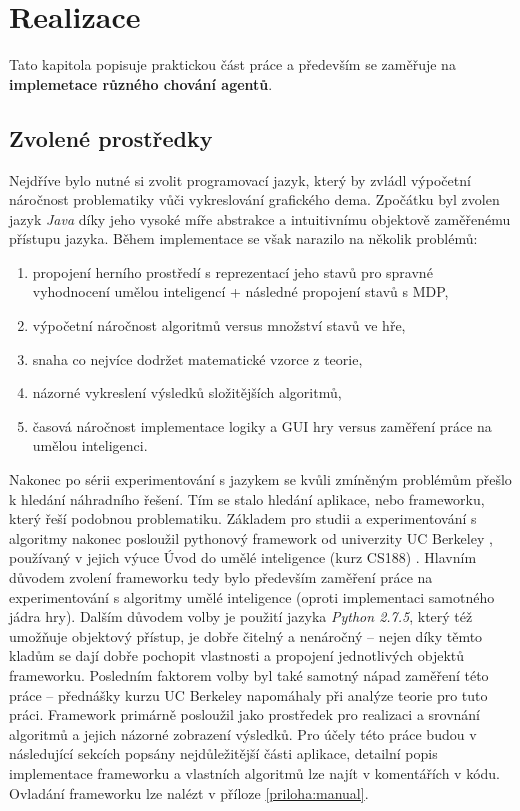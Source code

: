 \chapter{Realizace}
\label{realizace}
Tato kapitola popisuje praktickou část práce a především se zaměřuje na \textbf{implemetace různého chování agentů}.

\section{Zvolené prostředky}
Nejdříve bylo nutné si zvolit programovací jazyk, který by zvládl výpočetní náročnost problematiky vůči vykreslování grafického dema. Zpočátku byl zvolen jazyk \textit{Java} díky jeho vysoké míře abstrakce a intuitivnímu objektově zaměřenému přístupu jazyka. Během implementace se však narazilo na několik problémů: 
\begin{enumerate}
\item propojení herního prostředí s reprezentací jeho stavů pro spravné vyhodnocení umělou inteligencí + následné propojení stavů s MDP,
\item výpočetní náročnost algoritmů versus množství stavů ve hře,
\item snaha co nejvíce dodržet matematické vzorce z teorie,
\item názorné vykreslení výsledků složitějších algoritmů,
\item časová náročnost implementace logiky a GUI hry versus zaměření práce na umělou inteligenci.
\end{enumerate}
Nakonec po sérii experimentování s jazykem se kvůli zmíněným problémům přešlo k hledání náhradního řešení. Tím se stalo hledání aplikace, nebo frameworku, který řeší podobnou problematiku. Základem pro studii a experimentování s algoritmy nakonec posloužil pythonový framework od univerzity UC Berkeley \cite{pacmanProjects}, používaný v jejich výuce Úvod do umělé inteligence (kurz CS188) \cite{berkeley}. Hlavním důvodem zvolení frameworku tedy bylo především zaměření práce na experimentování s algoritmy umělé inteligence (oproti implementaci samotného jádra hry). Dalším důvodem volby je použití jazyka \textit{Python 2.7.5}, který též umožňuje objektový přístup, je dobře čitelný a nenáročný -- nejen díky těmto kladům se dají dobře pochopit vlastnosti a propojení jednotlivých objektů frameworku. Posledním faktorem volby byl také samotný nápad zaměření této práce -- přednášky kurzu UC Berkeley napomáhaly při analýze teorie pro tuto práci. Framework primárně posloužil jako prostředek pro realizaci a srovnání algoritmů a jejich názorné zobrazení výsledků.
Pro účely této práce budou v následující sekcích popsány nejdůležitější části aplikace, detailní popis implementace frameworku a vlastních algoritmů lze najít v komentářích v kódu. Ovladání frameworku lze nalézt v příloze \ref{priloha:manual}.

